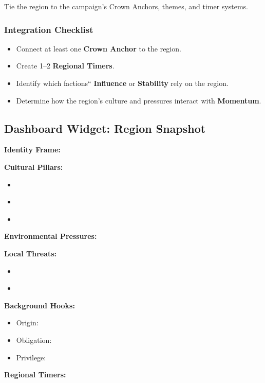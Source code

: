 \documentclass[11pt]{article}
\begin{document}
Tie the region to the campaign's Crown Anchors, themes, and timer systems.

\subsubsection{Integration Checklist}
\begin{itemize}
    \item Connect at least one \textbf{Crown Anchor} to the region.
    \item Create 1--2 \textbf{Regional Timers}.
    \item Identify which factions`` \textbf{Influence} or \textbf{Stability} rely on the region.
    \item Determine how the region's culture and pressures interact with \textbf{Momentum}.
\end{itemize}

\subsection{Dashboard Widget: Region Snapshot}

\begin{tcolorbox}[
  title=\textbf{Region Snapshot (Quick Reference)},
  colback=gray!10,
  colframe=black,
  fonttitle=\bfseries,
  left=6pt,
  right=6pt,
  top=6pt,
  bottom=6pt,
  enhanced,
  sharp corners
,breakable]

\textbf{Identity Frame:} \underline{\phantom{XXXXXXXXXXXX}}

\textbf{Cultural Pillars:}
\begin{itemize}[leftmargin=1.2em]
  \item \underline{\phantom{Pillar}}
  \item \underline{\phantom{Pillar}}
  \item \underline{\phantom{Pillar}}
\end{itemize}

\textbf{Environmental Pressures:} \underline{\phantom{XXXXXX}}

\textbf{Local Threats:}
\begin{itemize}[leftmargin=1.2em]
  \item \underline{\phantom{Threat}}
  \item \underline{\phantom{Threat}}
\end{itemize}

\textbf{Background Hooks:}
\begin{itemize}[leftmargin=1.2em]
  \item Origin: \underline{\phantom{XXXXX}}
  \item Obligation: \underline{\phantom{XXXXX}}
  \item Privilege: \underline{\phantom{XXXXX}}
\end{itemize}

\textbf{Regional Timers:} \underline{\phantom{XXXXXX}}

\end{tcolorbox}
\end{document}

